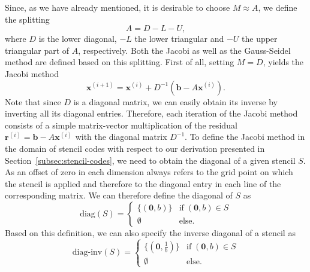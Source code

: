 Since, as we have already mentioned, it is desirable to choose $M \approx A$, we define the splitting
\begin{equation}
	A = D - L - U,
\end{equation} 
where $D$ is the lower diagonal, $-L$ the lower triangular and $-U$ the upper triangular part of $A$, respectively.
Both the Jacobi as well as the Gauss-Seidel method are defined based on this splitting.
First of all, setting $M = D$, yields the Jacobi method
\begin{equation}
	\bm{x}^{(i+1)} = \bm{x}^{(i)} + D^{-1}(\bm b - A \bm{x}^{(i)}).
	\label{eq:jacobi-method}
\end{equation}
Note that since $D$ is a diagonal matrix, we can easily obtain its inverse by inverting all its diagonal entries.
Therefore, each iteration of the Jacobi method consists of a simple matrix-vector multiplication of the residual $\bm{r}^{(i)} = \bm{b} - A \bm{x}^{(i)}$ with the diagonal matrix $D^{-1}$.
To define the Jacobi method in the domain of stencil codes with respect to our derivation presented in Section~\ref{subsec:stencil-codes}, we need to obtain the diagonal of a given stencil $S$.
As an offset of zero in each dimension always refers to the grid point on which the stencil is applied and therefore to the diagonal entry in each line of the corresponding matrix.
We can therefore define the diagonal of $S$ as
\begin{equation}
	\text{diag}(S) = \begin{cases}
		\{(\bm{0}, b) \} & \text{if} \; (\bm 0, b) \in S \\
		\emptyset & \text{else}.
	\end{cases}
	\label{eq:stencil-diag}
\end{equation}
Based on this definition, we can also specify the inverse diagonal of a stencil as
\begin{equation}
	\text{diag-inv}(S) = \begin{cases}
		\{(\bm{0}, \frac{1}{b}) \} & \text{if} \; (\bm 0, b) \in S \\
		\emptyset & \text{else}.
	\end{cases}
	\label{eq:stencil-diag-inv}
\end{equation}

